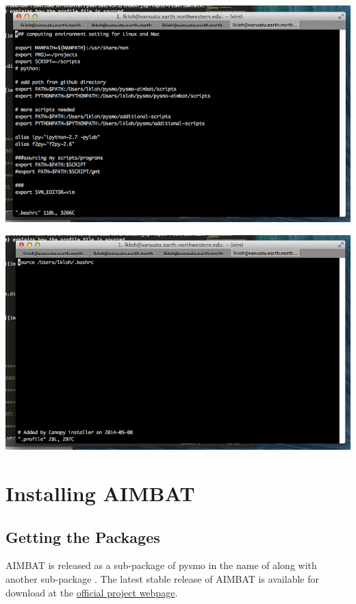 \documentclass[letterpaper,10pt,english]{sphinxmanual}
\begin{document}
\includegraphics{bashrc_home.png}

\includegraphics{profile_home.png}


\chapter{Installing AIMBAT}
\label{docfiles/install_aimbat::doc}\label{docfiles/install_aimbat:installing-aimbat}

\section{Getting the Packages}
\label{docfiles/install_aimbat:getting-the-packages}
AIMBAT is released as a sub-package of pysmo in the name of  along with another sub-package . The latest stable release of AIMBAT is available for download at the \href{http://www.earth.northwestern.edu/~xlou/aimbat.html}{official project webpage}.
\end{document}
